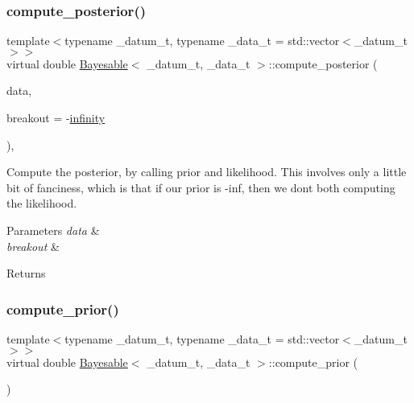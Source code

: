 \subsubsection{\texorpdfstring{compute\+\_\+posterior()}{compute\_posterior()}}
{\footnotesize\ttfamily template$<$typename \+\_\+datum\+\_\+t, typename \+\_\+data\+\_\+t = std\+::vector$<$\+\_\+datum\+\_\+t$>$$>$ \\
virtual double \hyperlink{class_bayesable}{Bayesable}$<$ \+\_\+datum\+\_\+t, \+\_\+data\+\_\+t $>$\+::compute\+\_\+posterior (\begin{DoxyParamCaption}\item[{const \hyperlink{class_bayesable_aa2788c4d7718c0a824e1d28c4c98f921}{data\+\_\+t} \&}]{data,  }\item[{const double}]{breakout = {\ttfamily -\/\hyperlink{_numerics_8h_a1bb1e42ae1b40cad6e99da0aab8a5576}{infinity}} }\end{DoxyParamCaption})\hspace{0.3cm}{\ttfamily [inline]}, {\ttfamily [virtual]}}

Compute the posterior, by calling prior and likelihood. This involves only a little bit of fanciness, which is that if our prior is -\/inf, then we don\textquotesingle{}t both computing the likelihood. 
\begin{DoxyParams}{Parameters}
{\em data} & \\
\hline
{\em breakout} & \\
\hline
\end{DoxyParams}
\begin{DoxyReturn}{Returns}

\end{DoxyReturn}
\mbox{\label{class_bayesable_a1b057a17212ced123545133e2297c01b}} 
\subsubsection{\texorpdfstring{compute\+\_\+prior()}{compute\_prior()}}
{\footnotesize\ttfamily template$<$typename \+\_\+datum\+\_\+t, typename \+\_\+data\+\_\+t = std\+::vector$<$\+\_\+datum\+\_\+t$>$$>$ \\
virtual double \hyperlink{class_bayesable}{Bayesable}$<$ \+\_\+datum\+\_\+t, \+\_\+data\+\_\+t $>$\+::compute\+\_\+prior (\begin{DoxyParamCaption}{ }\end{DoxyParamCaption})\hspace{0.3cm}{\ttfamily [pure virtual]}}



